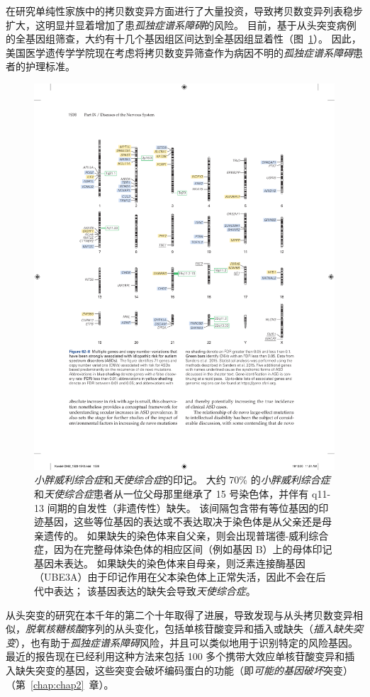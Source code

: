 在研究单纯性家族中的拷贝数变异方面进行了大量投资，导致拷贝数变异列表稳步扩大，这明显并显着增加了患\textit{孤独症谱系障碍}的风险。
目前，基于从头突变病例的全基因组筛查，大约有十几个基因组区间达到全基因组显着性（图~\ref{fig:62_8}）。
因此，美国医学遗传学学院现在考虑将拷贝数变异筛查作为病因不明的\textit{孤独症谱系障碍}患者的护理标准。


\begin{figure}[htbp]
	\centering
	\includegraphics[width=0.9\linewidth]{chap62/fig_62_8}
	\caption{\textit{小胖威利综合症}和\textit{天使综合症}的印记。
		大约 70\% 的\textit{小胖威利综合症}和\textit{天使综合症}患者从一位父母那里继承了 15 号染色体，并伴有 q11-13 间期的自发性（非遗传性）缺失。
		该间隔包含带有等位基因的印迹基因，这些等位基因的表达或不表达取决于染色体是从父亲还是母亲遗传的。
		如果缺失的染色体来自父亲，则会出现普瑞德-威利综合症，因为在完整母体染色体的相应区间（例如基因 B）上的母体印记基因未表达。
		如果缺失的染色体来自母亲，则泛素连接酶基因（UBE3A）由于印记作用在父本染色体上正常失活，因此不会在后代中表达；
		该基因表达的缺失会导致\textit{天使综合症}。}
	\label{fig:62_8}
\end{figure}


从头突变的研究在本千年的第二个十年取得了进展，导致发现与从头拷贝数变异相似，\textit{脱氧核糖核酸}序列的从头变化，包括单核苷酸变异和插入或缺失（\textit{插入缺失突变}），也有助于\textit{孤独症谱系障碍}风险，并且可以类似地用于识别特定的风险基因。
最近的报告现在已经利用这种方法来包括 100 多个携带大效应单核苷酸变异和插入缺失突变的基因，这些突变会破坏编码蛋白的功能（即\textit{可能的基因破坏}突变）（第~\ref{chap:chap2}~章）。


